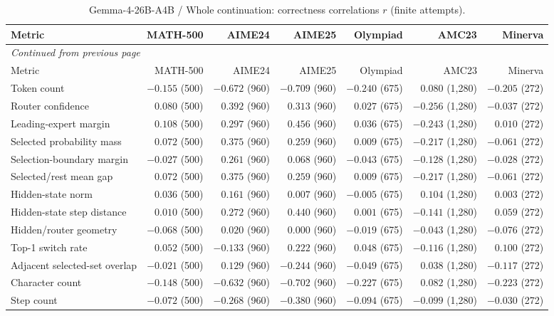 \begingroup\scriptsize\setlength{\tabcolsep}{4pt}
\begin{longtable}{@{}lrrrrrr@{}}
\caption{Gemma-4-26B-A4B / Whole continuation: correctness correlations $r$ (finite attempts).}\label{tab:multi-gemma-continuation}\\
\toprule
Metric & MATH-500 & AIME24 & AIME25 & Olympiad & AMC23 & Minerva \\
\midrule\endfirsthead
\multicolumn{7}{l}{\textit{Continued from previous page}}\\
\toprule
Metric & MATH-500 & AIME24 & AIME25 & Olympiad & AMC23 & Minerva \\
\midrule\endhead
\bottomrule\endfoot
Token count & $-0.155$ (500) & $-0.672$ (960) & $-0.709$ (960) & $-0.240$ (675) & $0.080$ (1,280) & $-0.205$ (272) \\
Router confidence & $0.080$ (500) & $0.392$ (960) & $0.313$ (960) & $0.027$ (675) & $-0.256$ (1,280) & $-0.037$ (272) \\
Leading-expert margin & $0.108$ (500) & $0.297$ (960) & $0.456$ (960) & $0.036$ (675) & $-0.243$ (1,280) & $0.010$ (272) \\
Selected probability mass & $0.072$ (500) & $0.375$ (960) & $0.259$ (960) & $0.009$ (675) & $-0.217$ (1,280) & $-0.061$ (272) \\
Selection-boundary margin & $-0.027$ (500) & $0.261$ (960) & $0.068$ (960) & $-0.043$ (675) & $-0.128$ (1,280) & $-0.028$ (272) \\
Selected/rest mean gap & $0.072$ (500) & $0.375$ (960) & $0.259$ (960) & $0.009$ (675) & $-0.217$ (1,280) & $-0.061$ (272) \\
Hidden-state norm & $0.036$ (500) & $0.161$ (960) & $0.007$ (960) & $-0.005$ (675) & $0.104$ (1,280) & $0.003$ (272) \\
Hidden-state step distance & $0.010$ (500) & $0.272$ (960) & $0.440$ (960) & $0.001$ (675) & $-0.141$ (1,280) & $0.059$ (272) \\
Hidden/router geometry & $-0.068$ (500) & $0.020$ (960) & $0.000$ (960) & $-0.019$ (675) & $-0.043$ (1,280) & $-0.076$ (272) \\
Top-1 switch rate & $0.052$ (500) & $-0.133$ (960) & $0.222$ (960) & $0.048$ (675) & $-0.116$ (1,280) & $0.100$ (272) \\
Adjacent selected-set overlap & $-0.021$ (500) & $0.129$ (960) & $-0.244$ (960) & $-0.049$ (675) & $0.038$ (1,280) & $-0.117$ (272) \\
Character count & $-0.148$ (500) & $-0.632$ (960) & $-0.702$ (960) & $-0.227$ (675) & $0.082$ (1,280) & $-0.223$ (272) \\
Step count & $-0.072$ (500) & $-0.268$ (960) & $-0.380$ (960) & $-0.094$ (675) & $-0.099$ (1,280) & $-0.030$ (272) \\
\end{longtable}\endgroup

